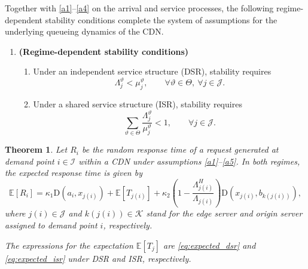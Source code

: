 \documentclass[a4paper,11pt,reqno]{amsart}
\newtheorem{theorem}{Theorem}
\newcommand{\E}{\mathbb{E}}
\newcommand{\K}{\mathcal{K}}
\newcommand{\I}{\mathcal{I}}
\newcommand{\J}{\mathcal{J}}
\newcommand{\D}{\mathrm{D}}
\begin{document}
Together with \ref{a1}--\ref{a4} on the arrival and service processes, the following regime-dependent stability conditions complete the system of assumptions for the underlying queueing dynamics of the CDN.

\begin{enumerate}[label=(A\arabic*), ref={\rm A\arabic*}, start=5]

\item \label{a5}\textbf{(Regime-dependent stability conditions)}
\begin{enumerate}[label=(A5.\alph*), ref= A5.\alph*]
\item \label{a5a}
Under an independent service structure (DSR), stability requires
$$
\Lambda^\vartheta_j < \mu^\vartheta_j,
\qquad \forall \vartheta \in \Theta,\ \forall j\in\J.
$$

\item \label{a5b}
Under a shared service structure (ISR), stability requires
$$
\sum_{\vartheta \in \Theta} \frac{\Lambda^\vartheta_j}{\mu^\vartheta_j} < 1,
\qquad \forall j\in\J.
$$

\end{enumerate}

\end{enumerate}

\begin{theorem}\label{thm:cdn_service_regimes}
Let $R_i$ be the random response time of a request generated at demand point $i \in \I$ within a {\rm CDN} under assumptions \ref{a1}--\ref{a5}. In both regimes, the expected response time is given by
\begin{equation}\label{eq:expected_time}
    \mathbb{E}[R_i]
=
\kappa_1 \D(a_i,x_{j(i)})+
\mathbb{E}[T_{j(i)}]
+ \kappa_2 \left(1-
\frac{\Lambda_{j(i)}^H}{\Lambda_{j(i)}}\right)  \D(x_{j(i)},b_{k(j(i))}),
\end{equation}
where $j(i)\in\J$ and $k(j(i))\in\K$ stand for the edge server and origin server assigned to demand point $i$, respectively.

The expressions for the expectation $\E[T_j]$ are \eqref{eq:expected_dsr} and \eqref{eq:expected_isr} under {\rm DSR} and {\rm ISR}, respectively.
\end{theorem}
\end{document}
